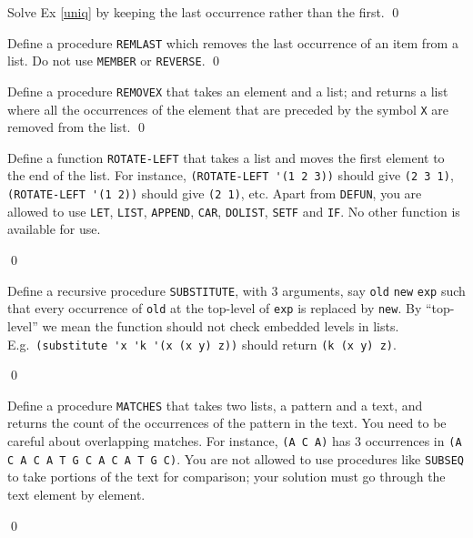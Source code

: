 \documentclass[a4paper,11pt]{article}
\begin{document}
\begin{uexercise}
Solve Ex \ref{uniq} by keeping the last occurrence rather than the first.
\qed
\end{uexercise}

\begin{uexercise}
Define a procedure \Verb+REMLAST+ which removes the last occurrence of an item from a list. Do not use \Verb+MEMBER+ or \Verb+REVERSE+.
\qed
\end{uexercise}

\begin{uexercise}

Define a procedure \Verb+REMOVEX+  that takes an element and a list; and returns a list where all the occurrences of the element that are preceded by the symbol \Verb+X+ are removed from the list.
\qed
\end{uexercise}

\begin{uexercise}
Define a function \Verb+ROTATE-LEFT+ that takes a list and moves the first element to the end of the list. For instance, \Verb+(ROTATE-LEFT '(1 2 3))+ should give \Verb+(2 3 1)+, \Verb+(ROTATE-LEFT '(1 2))+ should give \Verb+(2 1)+, etc. Apart from \Verb+DEFUN+, you are allowed to use \Verb+LET+, \Verb+LIST+, \Verb+APPEND+, \Verb+CAR+, \Verb+DOLIST+, \Verb+SETF+ and \Verb+IF+. No other function is available for use.

\qed
\end{uexercise}


\begin{uexercise}

Define a recursive  procedure \Verb+SUBSTITUTE+, with 3 arguments, say \Verb+old+ \Verb+new+ \Verb+exp+ such that every occurrence of \Verb+old+ at the top-level of \Verb+exp+ is replaced by \Verb+new+. By ``top-level'' we mean the function should not check embedded levels in lists. E.g.\ \Verb+(substitute 'x 'k '(x (x y) z))+ should return \Verb+(k (x y) z)+.

\qed
\end{uexercise}

\begin{uexercise}

Define a procedure \Verb+MATCHES+ that takes two lists, a pattern and a text, and returns the count of the occurrences of the pattern in the text. You need to be careful about overlapping matches. For instance, \Verb+(A C A)+ has 3 occurrences in \Verb+(A C A C A T G C A C A T G C)+. You are not allowed to use procedures like \Verb+SUBSEQ+ to take portions of the text for comparison; your solution must go through the text element by element.

\qed
\end{uexercise}
\end{document}
